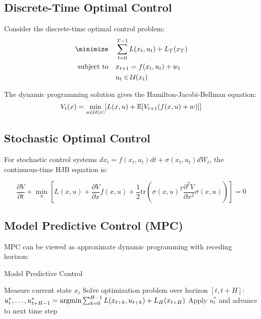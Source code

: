 \subsection{Discrete-Time Optimal Control}

Consider the discrete-time optimal control problem:
\begin{align}
\minimize \quad &\sum_{t=0}^{T-1} L(x_t, u_t) + L_T(x_T) \\
\text{subject to} \quad &x_{t+1} = f(x_t, u_t) + w_t \\
&u_t \in \mathcal{U}(x_t)
\end{align}

The dynamic programming solution gives the Hamilton-Jacobi-Bellman equation:
\begin{equation}
V_t(x) = \min_{u \in \mathcal{U}(x)} [L(x,u) + \mathbb{E}[V_{t+1}(f(x,u) + w)]]
\end{equation}

\subsection{Stochastic Optimal Control}

For stochastic control systems $dx_t = f(x_t, u_t) dt + \sigma(x_t, u_t) dW_t$, the continuous-time HJB equation is:

\begin{equation}
\frac{\partial V}{\partial t} + \min_u \left[L(x,u) + \frac{\partial V}{\partial x} f(x,u) + \frac{1}{2} \text{tr}\left(\sigma(x,u)^T \frac{\partial^2 V}{\partial x^2} \sigma(x,u)\right)\right] = 0
\end{equation}

\subsection{Model Predictive Control (MPC)}

MPC can be viewed as approximate dynamic programming with receding horizon:

\begin{algorithm}
\caption{Model Predictive Control}
\begin{algorithmic}
\REPEAT
    \STATE Measure current state $x_t$
    \STATE Solve optimization problem over horizon $[t, t+H]$:
    \STATE $u_t^*, \ldots, u_{t+H-1}^* = \operatorname*{argmin} \sum_{k=0}^{H-1} L(x_{t+k}, u_{t+k}) + L_H(x_{t+H})$
    \STATE Apply $u_t^*$ and advance to next time step
\end{algorithmic}
\end{algorithm}

